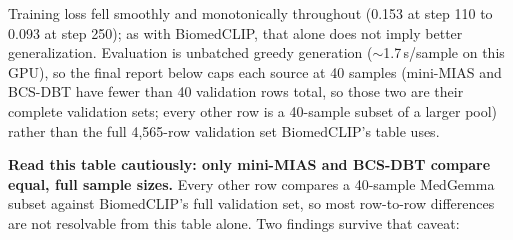 \documentclass[11pt]{article}
\begin{document}
Training loss fell smoothly and monotonically throughout (0.153 at step
110 to 0.093 at step 250); as with BiomedCLIP, that alone does not imply
better generalization. Evaluation is unbatched greedy generation
($\sim$1.7\,s/sample on this {GPU}), so the final report below caps each
source at 40 samples (mini-MIAS and {BCS-DBT} have fewer than 40
validation rows total, so those two are their complete validation sets;
every other row is a 40-sample subset of a larger pool) rather than the
full 4{,}565-row validation set BiomedCLIP's table uses.

\begin{table}[htbp]
  \centering
  \caption{MedGemma-{LoRA} vs.\ {BiomedCLIP}, final-checkpoint validation accuracy by source. mini-MIAS and {BCS-DBT} are full validation sets for both models ($n{=}10$ and $n{=}8$); every other {MedGemma} row is a 40-sample subset of {BiomedCLIP}'s full-set $n$.}
  \label{tab:medgemma}
\end{table}

\textbf{Read this table cautiously: only mini-MIAS and {BCS-DBT} compare
equal, full sample sizes.} Every other row compares a 40-sample
MedGemma subset against BiomedCLIP's full validation set, so most
row-to-row differences are not resolvable from this table alone.
Two findings survive that caveat:
\end{document}
